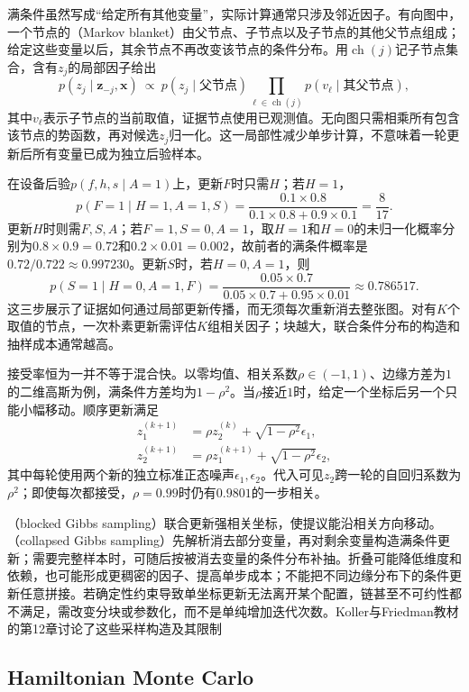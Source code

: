 满条件虽然写成“给定所有其他变量”，实际计算通常只涉及邻近因子。有向图中，一个节点的（Markov blanket）由父节点、子节点以及子节点的其他父节点组成；给定这些变量以后，其余节点不再改变该节点的条件分布。用$\operatorname{ch}(j)$记子节点集合，含有$z_j$的局部因子给出
\[
  p(z_j\mid\bm{z}_{-j},\bm{x})
    \ \propto\ p(z_j\mid\text{父节点})
       \prod_{\ell\in\operatorname{ch}(j)}
          p(v_\ell\mid\text{其父节点}),
\]
其中$v_\ell$表示子节点的当前取值，证据节点使用已观测值。无向图只需相乘所有包含该节点的势函数，再对候选$z_j$归一化。这一局部性减少单步计算，不意味着一轮更新后所有变量已成为独立后验样本。

在设备后验$p(f,h,s\mid A=1)$上，更新$F$时只需$H$；若$H=1$，
\[
  p(F=1\mid H=1,A=1,S)
    =\frac{0.1\times0.8}{0.1\times0.8+0.9\times0.1}
    =\frac{8}{17}.
\]
更新$H$时则需$F,S,A$；若$F=1,S=0,A=1$，取$H=1$和$H=0$的未归一化概率分别为$0.8\times0.9=0.72$和$0.2\times0.01=0.002$，故前者的满条件概率是$0.72/0.722\approx0.997230$。更新$S$时，若$H=0,A=1$，则
\[
  p(S=1\mid H=0,A=1,F)
    =\frac{0.05\times0.7}{0.05\times0.7+0.95\times0.01}
    \approx0.786517.
\]
这三步展示了证据如何通过局部更新传播，而无须每次重新消去整张图。对有$K$个取值的节点，一次朴素更新需评估$K$组相关因子；块越大，联合条件分布的构造和抽样成本通常越高。

接受率恒为一并不等于混合快。以零均值、相关系数$\rho\in(-1,1)$、边缘方差为$1$的二维高斯为例，满条件方差均为$1-\rho^2$。当$\rho$接近$1$时，给定一个坐标后另一个只能小幅移动。顺序更新满足
\[
  \begin{aligned}
    z_1^{(k+1)}&=\rho z_2^{(k)}+\sqrt{1-\rho^2}\epsilon_1,\\
    z_2^{(k+1)}&=\rho z_1^{(k+1)}+\sqrt{1-\rho^2}\epsilon_2,
  \end{aligned}
\]
其中每轮使用两个新的独立标准正态噪声$\epsilon_1,\epsilon_2$。代入可见$z_2$跨一轮的自回归系数为$\rho^2$；即使每次都接受，$\rho=0.99$时仍有$0.9801$的一步相关。

（blocked Gibbs sampling）联合更新强相关坐标，使提议能沿相关方向移动。（collapsed Gibbs sampling）先解析消去部分变量，再对剩余变量构造满条件更新；需要完整样本时，可随后按被消去变量的条件分布补抽。折叠可能降低维度和依赖，也可能形成更稠密的因子、提高单步成本；不能把不同边缘分布下的条件更新任意拼接。若确定性约束导致单坐标更新无法离开某个配置，链甚至不可约性都不满足，需改变分块或参数化，而不是单纯增加迭代次数。Koller与Friedman教材的第12章讨论了这些采样构造及其限制

\subsection{Hamiltonian Monte Carlo}
\label{sec:pgm-sampling-hmc}

